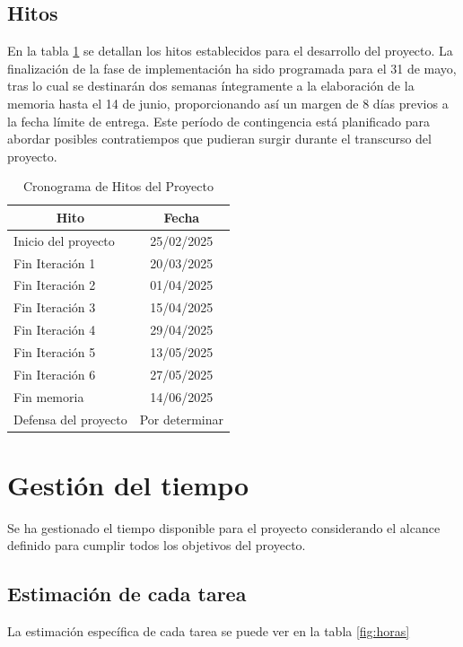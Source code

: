 \subsection{Hitos}\label{sec:hitos}

En la tabla \ref{tab:hitos} se detallan los hitos establecidos para el desarrollo del proyecto. La finalización de la fase de implementación ha sido programada para el 31 de mayo, tras lo cual se destinarán dos semanas íntegramente a la elaboración de la memoria hasta el 14 de junio, proporcionando así un margen de 8 días previos a la fecha límite de entrega. Este período de contingencia está planificado para abordar posibles contratiempos que pudieran surgir durante el transcurso del proyecto.


\begin{table}[H]\centering
\begin{tabular}{|l|c|}
\hline
\multicolumn{1}{|c|}{\textbf{Hito}} & \multicolumn{1}{c|}{\textbf{Fecha}} \\
\hline
Inicio del proyecto & 25/02/2025 \\
\hline
Fin Iteración 1 & 20/03/2025 \\
\hline
Fin Iteración 2 & 01/04/2025 \\
\hline
Fin Iteración 3 & 15/04/2025 \\
\hline
Fin Iteración 4 & 29/04/2025 \\
\hline
Fin Iteración 5 & 13/05/2025 \\
\hline
Fin Iteración 6 & 27/05/2025 \\
\hline
Fin memoria & 14/06/2025 \\
\hline
Defensa del proyecto & Por determinar \\
\hline
\end{tabular}
\caption{Cronograma de Hitos del Proyecto}
\label{tab:hitos}
\end{table}

\section{Gestión del tiempo}
Se ha gestionado el tiempo disponible para el proyecto considerando el alcance definido para cumplir todos los objetivos del proyecto. 

\subsection{Estimación de cada tarea}
La estimación específica de cada tarea se puede ver en la tabla \ref{fig:horas}

